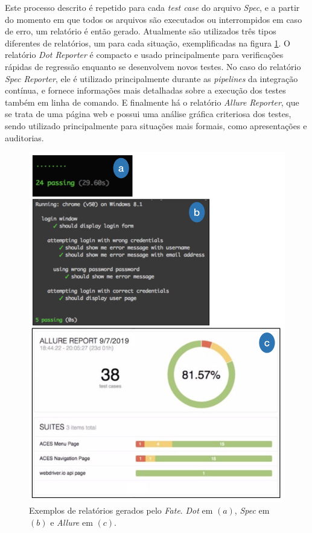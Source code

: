 Este processo descrito é repetido para cada \emph{test case} do arquivo \emph{Spec}, e a partir do momento em que todos os arquivos são executados ou interrompidos em caso de erro, um relatório é então gerado. Atualmente são utilizados três tipos diferentes de relatórios, um para cada situação, exemplificadas na figura \ref{fig:allure-report}. O relatório \emph{Dot Reporter} é compacto e usado principalmente para verificações rápidas de regressão enquanto se desenvolvem novos testes. No caso do relatório \emph{Spec Reporter}, ele é utilizado principalmente durante as \emph{pipelines} da integração contínua, e fornece informações mais detalhadas sobre a execução dos testes também em linha de comando. E finalmente há o relatório \emph{Allure Reporter}, que se trata de uma página web e possui uma análise gráfica criteriosa dos testes, sendo utilizado principalmente para situações mais formais, como apresentações e auditorias.

\begin{figure}[H]
    \centering
    \includegraphics[width=13cm]{source/4-solucao/images/fate-reporters-vertical.png}
    \caption{Exemplos de relatórios gerados pelo \emph{Fate}. \emph{Dot} em $(a)$, \emph{Spec} em $(b)$ e \emph{Allure} em $(c)$.}
    \label{fig:allure-report}
\end{figure}

